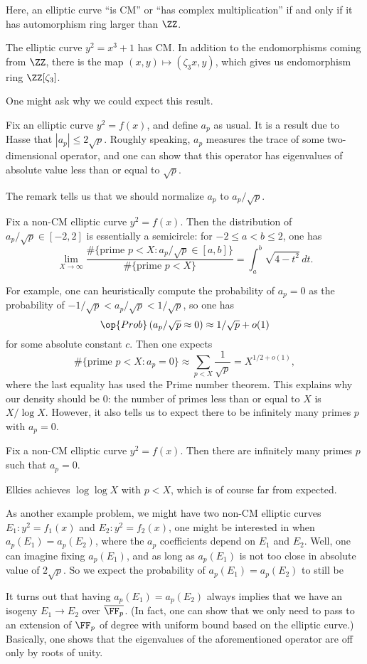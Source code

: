 \documentclass{article}
\begin{document}
Here, an elliptic curve ``is CM'' or ``has complex multiplication'' if and only if it has automorphism ring larger than $\ZZ$.
\begin{example}
	The elliptic curve $y^2=x^3+1$ has CM. In addition to the endomorphisms coming from $\ZZ$, there is the map $(x,y)\mapsto(\zeta_3x,y)$, which gives us endomorphism ring $\ZZ[\zeta_3]$.
\end{example}
One might ask why we could expect this result.
\begin{remark}
	Fix an elliptic curve $y^2=f(x)$, and define $a_p$ as usual. It is a result due to Hasse that $|a_p|\le2\sqrt p$. Roughly speaking, $a_p$ measures the trace of some two-dimensional operator, and one can show that this operator has eigenvalues of absolute value less than or equal to $\sqrt p$.
\end{remark}
The remark tells us that we should normalize $a_p$ to $a_p/\sqrt p$.
\begin{theorem}
	Fix a non-CM elliptic curve $y^2=f(x)$. Then the distribution of $a_p/\sqrt p\in[-2,2]$ is essentially a semicircle: for $-2\le a<b\le2$, one has
	\[\lim_{X\to\infty}\frac{\#\{\text{prime }p<X:a_p/\sqrt p\in[a,b]\}}{\#\{\text{prime }p<X\}}=\int_a^b\sqrt{4-t^2}\,dt.\]
\end{theorem}
For example, one can heuristically compute the probability of $a_p=0$ as the probability of $-1/\sqrt p<a_p/\sqrt p<1/\sqrt p$, so one has
\[\op{Prob}\left(a_p/\sqrt p\approx0\right)\approx1/\sqrt p+o(1)\]
for some absolute constant $c$. Then one expects
\[\#\{\text{prime }p<X:a_p=0\}\approx\sum_{p<X}\frac1{\sqrt p}=X^{1/2+o(1)},\]
where the last equality has used the Prime number theorem. This explains why our density should be $0$: the number of primes less than or equal to $X$ is $X/\log X$. However, it also tells us to expect there to be infinitely many primes $p$ with $a_p=0$.
\begin{theorem}[Elkies]
	Fix a non-CM elliptic curve $y^2=f(x)$. Then there are infinitely many primes $p$ such that $a_p=0$.
\end{theorem}
Elkies achieves $\log\log X$ with $p<X$, which is of course far from expected.

As another example problem, we might have two non-CM elliptic curves $E_1\colon y^2=f_1(x)$ and $E_2\colon y^2=f_2(x)$, one might be interested in when $a_p(E_1)=a_p(E_2)$, where the $a_p$ coefficients depend on $E_1$ and $E_2$. Well, one can imagine fixing $a_p(E_1)$, and as long as $a_p(E_1)$ is not too close in absolute value of $2\sqrt p$. So we expect the probability of $a_p(E_1)=a_p(E_2)$ to still be 
\begin{remark}
	It turns out that having $a_p(E_1)=a_p(E_2)$ always implies that we have an isogeny $E_1\to E_2$ over $\overline{\FF_p}$. (In fact, one can show that we only need to pass to an extension of $\FF_p$ of degree with uniform bound based on the elliptic curve.) Basically, one shows that the eigenvalues of the aforementioned operator are off only by roots of unity.
\end{remark}
\end{document}
